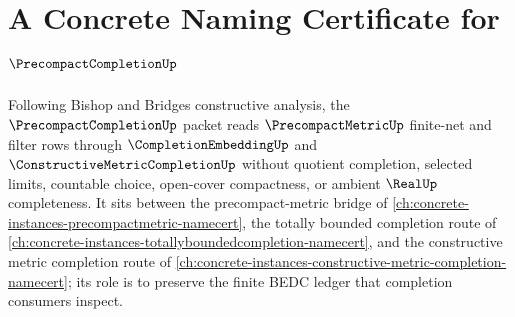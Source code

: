 \chapter{A Concrete Naming Certificate for $\PrecompactCompletionUp$}
\label{ch:concrete-instances-precompact-completion-namecert}

Following Bishop and Bridges constructive analysis, the $\PrecompactCompletionUp$ packet reads $\PrecompactMetricUp$ finite-net and filter rows through $\CompletionEmbeddingUp$ and $\ConstructiveMetricCompletionUp$ without quotient completion, selected limits, countable choice, open-cover compactness, or ambient $\RealUp$ completeness. It sits between the precompact-metric bridge of \autoref{ch:concrete-instances-precompactmetric-namecert}, the totally bounded completion route of \autoref{ch:concrete-instances-totallyboundedcompletion-namecert}, and the constructive metric completion route of \autoref{ch:concrete-instances-constructive-metric-completion-namecert}; its role is to preserve the finite BEDC ledger that completion consumers inspect.

